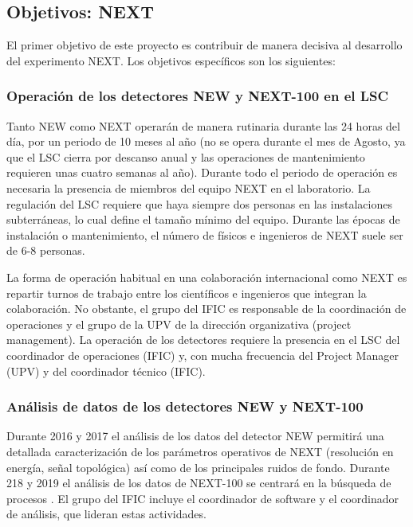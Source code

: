 \subsection*{Objetivos: NEXT}

El primer objetivo de este proyecto es contribuir de manera decisiva al desarrollo del experimento NEXT. Los objetivos específicos son los siguientes:

\subsubsection*{Operación de los detectores NEW y NEXT-100 en el LSC}

Tanto NEW como NEXT operarán de manera rutinaria durante las 24 horas del día, por un periodo de 10 meses al año (no se opera durante el mes de Agosto, ya que el LSC cierra por descanso anual y las operaciones de mantenimiento requieren unas cuatro semanas al año). Durante todo el periodo de operación es necesaria la presencia de miembros del equipo NEXT en el laboratorio. La regulación del LSC requiere que haya siempre dos personas en las instalaciones subterráneas, lo cual define el tamaño mínimo del equipo. Durante las épocas de instalación o mantenimiento, el número de físicos e ingenieros de NEXT suele ser de 6-8 personas.

La forma de operación habitual en una colaboración internacional como NEXT es repartir turnos de trabajo entre los científicos e ingenieros que integran la colaboración. No obstante, el grupo del IFIC es responsable de la coordinación de operaciones y el grupo de la UPV de la dirección organizativa (project management). La operación de los detectores requiere la presencia en el LSC del coordinador de operaciones (IFIC) y, con mucha frecuencia del Project Manager (UPV) y del coordinador técnico (IFIC). 

\subsubsection*{Análisis de datos de los detectores NEW y NEXT-100} 

Durante 2016 y 2017 el análisis de los datos del detector NEW permitirá una detallada caracterización de los parámetros operativos de NEXT (resolución en energía, señal topológica) así como de los principales ruidos de fondo. Durante 218 y 2019 el análisis de los datos de NEXT-100 se centrará en la búsqueda de procesos \bbonu. El grupo del IFIC incluye el coordinador de software y el coordinador de análisis, que lideran estas actividades. 


